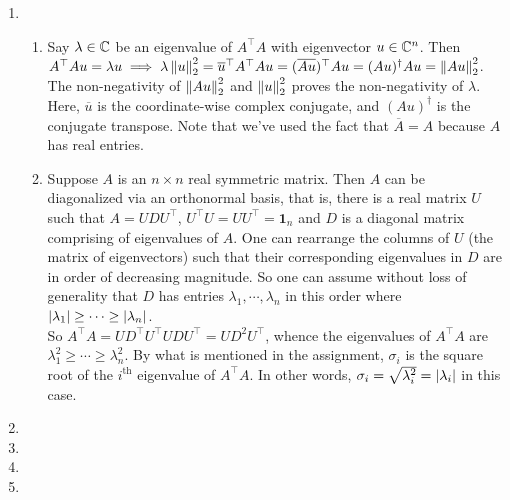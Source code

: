 \begin{enumerate}[leftmargin=*]
\item 
\begin{enumerate}
\item Say $\lambda\in\mathbb{C}$ be an eigenvalue of $A^\top A$ with eigenvector $u\in\mathbb{C}^n$. Then $A^\top Au=\lambda u\implies \lambda \left\lVert u \right\rVert_{2}^2 =\overline{u}^\top A^\top Au = (\overline{Au})^\top Au = (Au)^\dagger Au = \left\lVert Au \right\rVert_{2}^2$. The non-negativity of $\left\lVert Au \right\rVert_{2}^2$ and $\left\lVert u \right\rVert_{2}^2$ proves the non-negativity of $\lambda$. \\
Here, $\overline u$ is the coordinate-wise complex conjugate, and $(Au)^\dagger$ is the conjugate transpose. Note that we've used the fact that $\overline A = A$ because $A$ has real entries.
\item Suppose $A$ is an $n\times n$ real symmetric matrix. Then $A$ can be diagonalized via an orthonormal basis, that is, there is a real matrix $U$ such that $A=UDU^\top$, $U^\top U = UU^\top = \pmb 1_n$ and $D$ is a diagonal matrix comprising of eigenvalues of $A$. One can rearrange the columns of $U$ (the matrix of eigenvectors) such that their corresponding eigenvalues in $D$ are in order of decreasing magnitude. So one can assume without loss of generality that $D$ has entries $\lambda_1,\cdots,\lambda_n$ in this order where $\left| \lambda_1 \right|\geq \cdots \geq \left| \lambda_n \right|$.\\
So $A^\top A = UD^\top U^\top UDU^\top = UD^2U^\top$, whence the eigenvalues of $A^\top A$ are $\lambda_1^2\geq \cdots\geq \lambda_n^2$. By what is mentioned in the assignment, $\sigma_i$ is the square root of the $i^{\text{th}}$ eigenvalue of $A^\top A$. In other words, $\sigma_i = \sqrt{\lambda_i^2} = \left| \lambda_i \right|$ in this case.
\end{enumerate}
\item 

\item 

\item 

\item 

\end{enumerate}












\newpage
\pb

